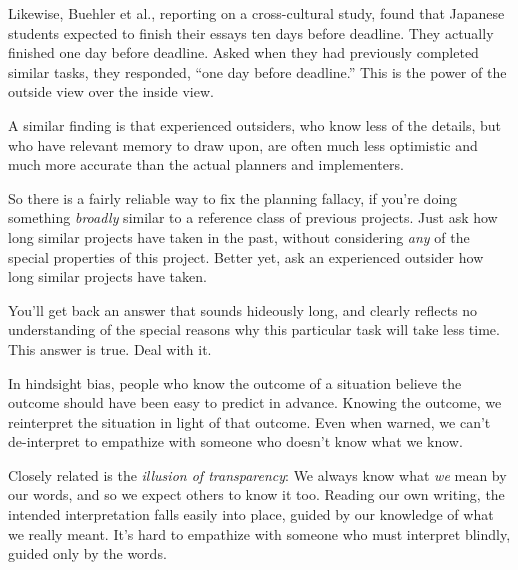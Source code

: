 {
 Likewise, Buehler et al., reporting on a cross-cultural study,
found that Japanese students expected to finish their essays ten days
before deadline. They actually finished one day before deadline. Asked
when they had previously completed similar tasks, they responded,
``one day before
deadline.'' This is the power of
the outside view over the inside view.}

{
 A similar finding is that experienced outsiders, who know less of
the details, but who have relevant memory to draw upon, are often much
less optimistic and much more accurate than the actual planners and
implementers.}

{
 So there is a fairly reliable way to fix the planning fallacy, if
you're doing something \textit{broadly} similar to a
reference class of previous projects. Just ask how long similar
projects have taken in the past, without considering \textit{any} of
the special properties of this project. Better yet, ask an experienced
outsider how long similar projects have taken.}

{
 You'll get back an answer that sounds hideously
long, and clearly reflects no understanding of the special reasons why
this particular task will take less time. This answer is true. Deal
with it.}

\myendsectiontext


\bigskip


{
 In hindsight bias, people who know the outcome of a situation
believe the outcome should have been easy to predict in advance.
Knowing the outcome, we reinterpret the situation in light of that
outcome. Even when warned, we can't de-interpret to
empathize with someone who doesn't know what we know. }

{
 Closely related is the \textit{illusion of transparency}: We
always know what \textit{we} mean by our words, and so we expect others
to know it too. Reading our own writing, the intended interpretation
falls easily into place, guided by our knowledge of what we really
meant. It's hard to empathize with someone who must
interpret blindly, guided only by the words.}

